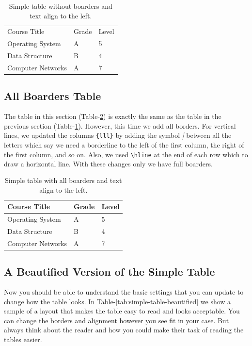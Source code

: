 \begin{table}[H]
    \centering
    \begin{tabular}{lll}
        Course Title      & Grade & Level \\
        Operating System  & A     & 5     \\
        Data Structure    & B     & 4     \\
        Computer Networks & A     & 7     \\
    \end{tabular}
    \caption{Simple table without boarders and text align to the left.}
    \label{tab:simple-table}
\end{table}


\subsection{All Boarders Table}

The table in this section (Table-\ref{tab:simple-table-all-boarders}) is exactly the same as the table in the previous section (Table-\ref{tab:simple-table}). However, this time we add all borders. For vertical lines, we updated the columns \verb|{lll}| by adding the symbol \emph{|} between all the letters which say we need a borderline to the left of the first column, the right of the first column, and so on. Also, we used \verb|\hline| at the end of each row which to draw a horizontal line. With these changes only we have full boarders.

\begin{table}[H]
    \centering
    \begin{tabular}{|l|l|l|}
        \hline
        Course Title      & Grade & Level \\ \hline
        Operating System  & A     & 5     \\ \hline
        Data Structure    & B     & 4     \\ \hline
        Computer Networks & A     & 7     \\ \hline
    \end{tabular}
    \caption{Simple table with all boarders and text align to the left.}
    \label{tab:simple-table-all-boarders}
\end{table}


\subsection{A Beautified Version of the Simple Table}

Now you should be able to understand the basic settings that you can update to change how the table looks. In Table-\ref{tab:simple-table-beautified} we show a sample of a layout that makes the table easy to read and looks acceptable. You can change the borders and alignment however you see fit in your case. But always think about the reader and how you could make their task of reading the tables easier.

